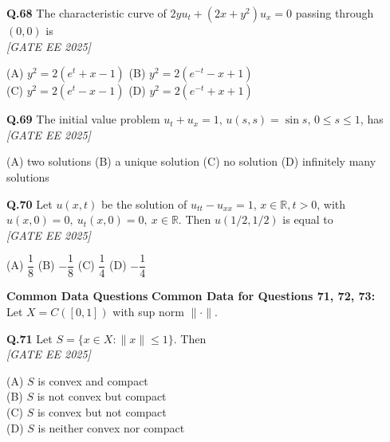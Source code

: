 \documentclass[11pt]{article}
\begin{document}
\begin{flushleft}
\textbf{Q.68} The characteristic curve of $2y u_t + (2x + y^2) u_x = 0$ passing through $(0, 0)$ is 
\\[1ex] \textit{[GATE EE 2025]}

(A) $y^2 = 2(e^t + x - 1)$ \hspace{2em}
(B) $y^2 = 2(e^{-t} - x + 1)$ \\
(C) $y^2 = 2(e^t - x - 1)$ \hspace{2em}
(D) $y^2 = 2(e^{-t} + x + 1)$
\end{flushleft}

\begin{flushleft}
\textbf{Q.69} The initial value problem $u_t + u_x = 1$, $u(s,s) = \sin s$, $0 \leq s \leq 1$, has 
\\[1ex] \textit{[GATE EE 2025]}


(A) two solutions \hspace{2em}
(B) a unique solution \hspace{2em}
(C) no solution \hspace{2em}
(D) infinitely many solutions
\end{flushleft}

\begin{flushleft}
\textbf{Q.70} Let $u(x,t)$ be the solution of $u_{tt} - u_{xx} = 1$, $x \in \mathbb{R}, t > 0$, with \\
$u(x,0) = 0, \ u_t(x,0) = 0, \ x \in \mathbb{R}$. Then $u(1/2, 1/2)$ is equal to 
\\[1ex] \textit{[GATE EE 2025]}

(A) $\dfrac{1}{8}$ \hspace{2em} 
(B) $-\dfrac{1}{8}$ \hspace{2em} 
(C) $\dfrac{1}{4}$ \hspace{2em} 
(D) $-\dfrac{1}{4}$
\end{flushleft}

\begin{flushleft}
\textbf{Common Data Questions}
\newline
\textbf{Common Data for Questions 71, 72, 73:} \\
Let $X = C([0,1])$ with sup norm $\| \cdot \|$.
\end{flushleft}

\begin{flushleft}
\textbf{Q.71} Let $S = \{ x \in X : \|x\| \leq 1 \}$. Then 
\\[1ex] \textit{[GATE EE 2025]}


(A) $S$ is convex and compact \\
(B) $S$ is not convex but compact \\
(C) $S$ is convex but not compact \\
(D) $S$ is neither convex nor compact
\end{flushleft}
\end{document}
